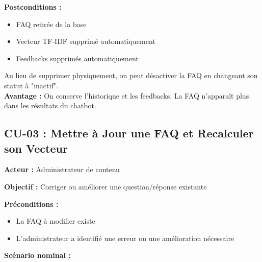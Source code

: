 \documentclass[11pt,a4paper]{article}
\begin{document}
\textbf{Postconditions :}
\begin{itemize}
    \item FAQ retirée de la base
    \item Vecteur TF-IDF supprimé automatiquement
    \item Feedbacks supprimés automatiquement
\end{itemize}

\begin{astuce}
Au lieu de supprimer physiquement, on peut désactiver la FAQ en changeant son statut à "inactif". \\
\textbf{Avantage :} On conserve l'historique et les feedbacks. La FAQ n'apparaît plus dans les résultats du chatbot.
\end{astuce}

\clearpage

\subsection{CU-03 : Mettre à Jour une FAQ et Recalculer son Vecteur}

\textbf{Acteur :} Administrateur de contenu

\textbf{Objectif :} Corriger ou améliorer une question/réponse existante

\textbf{Préconditions :}
\begin{itemize}
    \item La FAQ à modifier existe
    \item L'administrateur a identifié une erreur ou une amélioration nécessaire
\end{itemize}

\textbf{Scénario nominal :}
\end{document}
